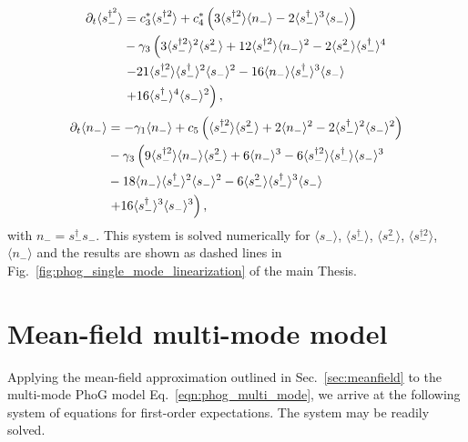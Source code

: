 \begin{align}
%
%
\partial_t\langle s_-^{\dagger^2} \rangle &= c_3^* \langle s_-^{\dagger 2}\rangle + c_4^* \left(3 \langle s_-^{\dagger 2} \rangle \langle n_- \rangle - 2 \langle s_-^\dagger \rangle^3 \langle s_- \rangle \right) \notag \\
%
&- \gamma_3 \left(3 \langle s_-^{\dagger 2} \rangle^2 \langle s_-^2 \rangle + 12 \langle s_-^{\dagger 2} \rangle \langle n_- \rangle^2 - 2\langle s_-^2 \rangle \langle s_-^\dagger \rangle^4 \right. \notag \\
%
&\left. - 21 \langle s_-^{\dagger 2}\rangle \langle s_-^\dagger\rangle^2 \langle s_- \rangle^2 - 16 \langle n_- \rangle \langle s_-^\dagger \rangle^3 \langle s_-\rangle \right. \notag \\
%
& \left.+ 16 \langle s_-^\dagger\rangle^4 \langle s_- \rangle^2 \right),\notag
\end{align}
\begin{align}\label{eqn:expectations_linear_last}
%
%
\partial_t \langle n_- \rangle &= - \gamma_1 \langle n_- \rangle + c_5 \left( \langle s_-^{\dagger 2} \rangle \langle s_-^2 \rangle + 2 \langle n_- \rangle^2 - 2 \langle s_-^\dagger \rangle^2 \langle s_- \rangle^2 \right) \notag \\
%
&- \gamma_3 \left( 9 \langle s_-^{\dagger 2} \rangle \langle n_-  \rangle \langle s_-^2\rangle + 6 \langle n_-\rangle^3  - 6 \langle s_-^{\dagger 2}\rangle \langle s_-^\dagger \rangle \langle s_- \rangle^3 \right. \notag \\
%
& - 18 \langle n_- \rangle \langle s_-^\dagger \rangle^2 \langle s_- \rangle^2 - 6 \langle s_-^2 \rangle \langle s_-^\dagger \rangle^3 \langle s_- \rangle \notag \\
%
& \left. + 16 \langle s_-^\dagger \rangle^3 \langle s_-\rangle^3 \right),
\end{align}
with $n_- = s_-^\dagger s_-$. This system is solved numerically for $\langle s_- \rangle$, $\langle s_-^\dagger \rangle$, $\langle s_-^2\rangle$, $\langle s_-^{\dagger 2}\rangle$, $\langle n_-\rangle$ and the results are shown as dashed lines in Fig.~\ref{fig:phog_single_mode_linearization} of the main Thesis.

\section{Mean-field multi-mode model}\label{appendix:mean_field}
Applying the mean-field approximation outlined in Sec.~\ref{sec:meanfield} to the multi-mode PhoG model Eq.~\ref{eqn:phog_multi_mode}, we arrive at the following system of equations for first-order expectations. The system may be readily solved.

